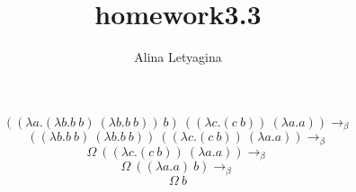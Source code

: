 \documentclass{article}
\title{homework3.3}
\author{Alina Letyagina}
\begin{document}
$$((\lambda a.(\lambda b.b\ b)\ (\lambda b.b\ b))\ b)\ ((\lambda c.(c\ b))\ (\lambda a.a)) \rightarrow_\beta$$
$$((\lambda b.b\ b)\ (\lambda b.b\ b))\ ((\lambda c.(c\ b))\ (\lambda a.a)) \rightarrow_\beta$$
$$\Omega\ ((\lambda c.(c\ b))\ (\lambda a.a)) \rightarrow_\beta$$
$$\Omega\ ((\lambda a.a)\ b) \rightarrow_\beta$$
$$\Omega\ b$$
\end{document}
